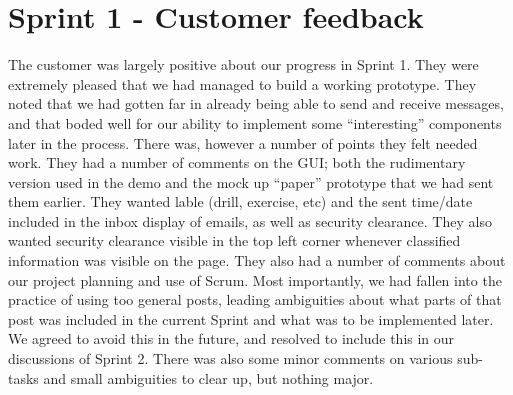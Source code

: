 \section{Sprint 1 - Customer feedback}

The customer was largely positive about our progress in Sprint 1. They were extremely pleased that we had managed to build a working prototype. They noted that we had gotten far in already being able to send and receive messages, and that boded well for our ability to implement some “interesting” components later in the process.
\newline
\newline
There was, however a number of points they felt needed work. They had a number of comments on the GUI; both the rudimentary version used in the demo and the mock up “paper” prototype that we had sent them earlier. They wanted lable (drill, exercise, etc) and the sent time/date included in the inbox display of emails, as well as security clearance. They also wanted security clearance visible in the top left corner whenever classified information was visible on the page. 
\newline
\newline
They also had a number of comments about our project planning and use of Scrum. Most importantly, we had fallen into the practice of using too general posts, leading ambiguities about what parts of that post was included in the current Sprint and what was to be implemented later. We agreed to avoid this in the future, and resolved to include this in our discussions of Sprint 2. There was also some minor comments on various sub-tasks and small ambiguities to clear up, but nothing major.